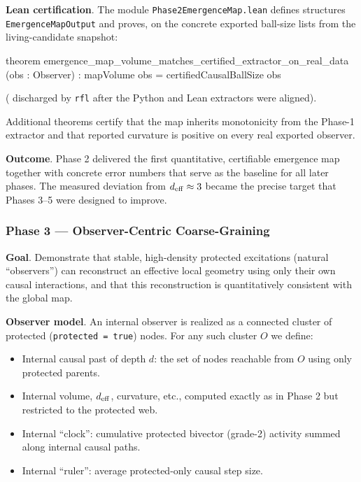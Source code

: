 \documentclass[
  11pt,
  a4paper,
]{article}
\newenvironment{Shaded}{\begin{snugshade}}{\end{snugshade}}
\newcommand{\NormalTok}[1]{#1}
\providecommand{\tightlist}{%
  \setlength{\itemsep}{0pt}\setlength{\parskip}{0pt}}
\begin{document}
\textbf{Lean certification}. The module \texttt{Phase2EmergenceMap.lean}
defines structures \texttt{EmergenceMapOutput} and proves, on the
concrete exported ball-size lists from the living-candidate snapshot:

\begin{Shaded}
\begin{Highlighting}[]
\NormalTok{theorem emergence\_map\_volume\_matches\_certified\_extractor\_on\_real\_data}
\NormalTok{    (obs : Observer) :}
\NormalTok{    mapVolume obs = certifiedCausalBallSize obs}
\end{Highlighting}
\end{Shaded}

( discharged by \texttt{rfl} after the Python and Lean extractors were
aligned).

Additional theorems certify that the map inherits monotonicity from the
Phase-1 extractor and that reported curvature is positive on every real
exported observer.

\textbf{Outcome}. Phase 2 delivered the first quantitative, certifiable
emergence map together with concrete error numbers that serve as the
baseline for all later phases. The measured deviation from
\(d_{\rm eff} \approx 3\) became the precise target that Phases 3--5
were designed to improve.

\subsubsection{Phase 3 --- Observer-Centric
Coarse-Graining}\label{phase-3-observer-centric-coarse-graining}

\textbf{Goal}. Demonstrate that stable, high-density protected
excitations (natural ``observers'') can reconstruct an effective local
geometry using only their own causal interactions, and that this
reconstruction is quantitatively consistent with the global map.

\textbf{Observer model}. An internal observer is realized as a connected
cluster of protected (\texttt{protected\ =\ true}) nodes. For any such
cluster \(O\) we define:

\begin{itemize}
\tightlist
\item
  Internal causal past of depth \(d\): the set of nodes reachable from
  \(O\) using only protected parents.
\item
  Internal volume, \(d_{\rm eff}\), curvature, etc., computed exactly as
  in Phase 2 but restricted to the protected web.
\item
  Internal ``clock'': cumulative protected bivector (grade-2) activity
  summed along internal causal paths.
\item
  Internal ``ruler'': average protected-only causal step size.
\end{itemize}
\end{document}
